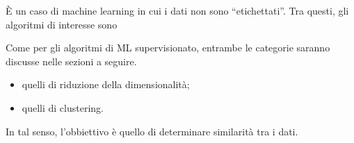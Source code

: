 \documentclass{subfiles}
\begin{document}
\`E un caso di machine learning in cui i dati non sono ``etichettati''.
Tra questi, gli algoritmi di interesse sono
\begin{MarginNote}
    Come per gli algoritmi di ML supervisionato, entrambe le categorie saranno discusse nelle sezioni a seguire.
\end{MarginNote}
\begin{itemize}
    \item quelli di riduzione della dimensionalità;
    \item quelli di clustering.
\end{itemize}
In tal senso, l'obbiettivo è quello di determinare similarità tra i dati.
\end{document}
